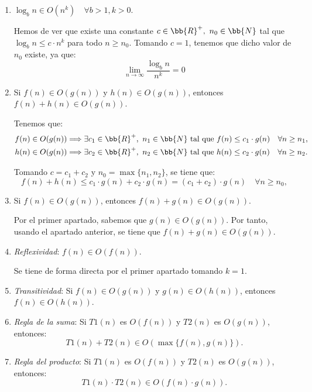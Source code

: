 \begin{ejercicio}
\begin{enumerate}[label=\alph*)]
        \item $\log_b n \in O(n^k) \quad \forall b>1,k>0$.
        
        Hemos de ver que existe una constante $c\in \bb{R}^+,~n_0\in \bb{N}$ tal que $\log_b n \leq c\cdot n^k$ para todo $n\geq n_0$.
        Tomando $c=1$, tenemos que dicho valor de $n_0$ existe, ya que:
        \begin{equation*}
            \lim_{n\to\infty} \frac{\log_b n}{n^k} = 0
        \end{equation*}

        \item Si $f(n)\in O(g(n))$ y $h(n)\in O(g(n))$, entonces $f(n)+h(n)\in O(g(n))$.
        
        Tenemos que:
        \begin{align*}
            f(n)\in O(g(n)) &\Longrightarrow \exists c_1\in \bb{R}^+,~n_1\in \bb{N} \text{ tal que } f(n)\leq c_1\cdot g(n) \quad \forall n\geq n_1, \\
            h(n)\in O(g(n)) &\Longrightarrow \exists c_2\in \bb{R}^+,~n_2\in \bb{N} \text{ tal que } h(n)\leq c_2\cdot g(n) \quad \forall n\geq n_2.
        \end{align*}

        Tomando $c=c_1+c_2$ y $n_0=\max\{n_1,n_2\}$, se tiene que:
        \begin{equation*}
            f(n)+h(n)\leq c_1\cdot g(n) + c_2\cdot g(n) = (c_1+c_2)\cdot g(n) \quad \forall n\geq n_0,
        \end{equation*}
        
        \item Si $f(n)\in O(g(n))$, entonces $f(n)+g(n)\in O(g(n))$.
        
        Por el primer apartado, sabemos que $g(n)\in O(g(n))$.
        Por tanto, usando el apartado anterior, se tiene que $f(n)+g(n)\in O(g(n))$.

        \item \emph{Reflexividad}: $f(n)\in O(f(n))$.
        
        Se tiene de forma directa por el primer apartado tomando $k=1$.

        \item \emph{Transitividad}: Si $f(n)\in O(g(n))$ y $g(n)\in O(h(n))$, entonces $f(n)\in O(h(n))$.
        \item \emph{Regla de la suma}: Si $T1(n)$ es $O(f(n))$ y $T2(n)$ es $O(g(n))$, entonces: $$T1(n)+T2(n)\in O(\max\{f(n),g(n)\}).$$
        \item \emph{Regla del producto}: Si $T1(n)$ es $O(f(n))$ y $T2(n)$ es $O(g(n))$, entonces: $$T1(n)\cdot T2(n)\in O(f(n)\cdot g(n)).$$
    \end{enumerate}
\end{ejercicio}

